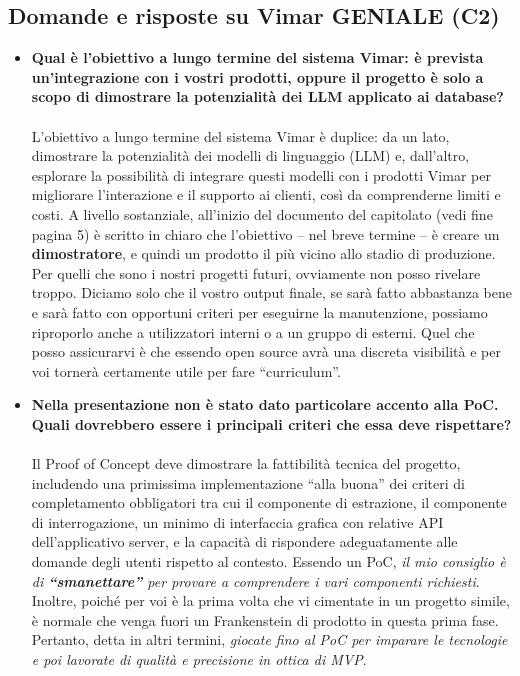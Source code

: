     \subsection{Domande e risposte su Vimar GENIALE (C2)}
    \begin{itemize}
        \item \textbf{Qual è l'obiettivo a lungo termine del sistema Vimar: è prevista un'integrazione con i vostri prodotti, oppure il progetto è solo a scopo di dimostrare la potenzialità dei LLM applicato ai database? }\\\\
        L'obiettivo a lungo termine del sistema Vimar è duplice: da un lato, dimostrare la potenzialità dei modelli di linguaggio (LLM) e, dall'altro, esplorare la possibilità di integrare questi modelli con i prodotti Vimar per migliorare l'interazione e il supporto ai clienti, così da comprenderne limiti e costi. A livello sostanziale, all'inizio del documento del capitolato (vedi fine pagina 5) è scritto in chiaro che l'obiettivo – nel breve termine – è creare un \textbf{dimostratore}, e quindi un prodotto il più vicino allo stadio di produzione. Per quelli che sono i nostri progetti futuri, ovviamente non posso rivelare troppo. Diciamo solo che il vostro output finale, se sarà fatto abbastanza bene e sarà fatto con opportuni criteri per eseguirne la manutenzione, possiamo riproporlo anche a utilizzatori interni o a un gruppo di esterni. Quel che posso assicurarvi è che essendo open source avrà una discreta visibilità e per voi tornerà certamente utile per fare “curriculum”.
        
        \item \textbf{Nella presentazione non è stato dato particolare accento alla PoC. Quali dovrebbero essere i principali criteri che essa deve rispettare?} \\\\
        Il Proof of Concept deve dimostrare la fattibilità tecnica del progetto, includendo una primissima implementazione “alla buona” dei criteri di completamento obbligatori tra cui il componente di estrazione, il componente di interrogazione, un minimo di interfaccia grafica con relative API dell'applicativo server, e la capacità di rispondere adeguatamente alle domande degli utenti rispetto al contesto. Essendo un PoC, \textit{il mio consiglio è di \textbf{“smanettare”} per provare a comprendere i vari componenti richiesti}. Inoltre, poiché per voi è la prima volta che vi cimentate in un progetto simile, è normale che venga fuori un Frankenstein di prodotto in questa prima fase. Pertanto, detta in altri termini, \textit{giocate fino al PoC per imparare le tecnologie e poi lavorate di qualità e precisione in ottica di MVP}.
        

\end{itemize}
